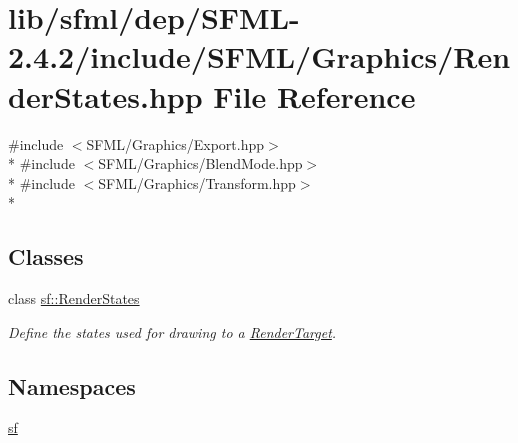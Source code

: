 \hypertarget{sfml_2dep_2_s_f_m_l-2_84_82_2include_2_s_f_m_l_2_graphics_2_render_states_8hpp}{\section{lib/sfml/dep/\-S\-F\-M\-L-\/2.4.2/include/\-S\-F\-M\-L/\-Graphics/\-Render\-States.hpp File Reference}
\label{sfml_2dep_2_s_f_m_l-2_84_82_2include_2_s_f_m_l_2_graphics_2_render_states_8hpp}
}
{\ttfamily \#include $<$S\-F\-M\-L/\-Graphics/\-Export.\-hpp$>$}\\*
{\ttfamily \#include $<$S\-F\-M\-L/\-Graphics/\-Blend\-Mode.\-hpp$>$}\\*
{\ttfamily \#include $<$S\-F\-M\-L/\-Graphics/\-Transform.\-hpp$>$}\\*
\subsection*{Classes}
\begin{DoxyCompactItemize}
\item 
class \hyperlink{classsf_1_1_render_states}{sf\-::\-Render\-States}
\begin{DoxyCompactList}\small\item\em Define the states used for drawing to a \hyperlink{classsf_1_1_render_target}{Render\-Target}. \end{DoxyCompactList}\end{DoxyCompactItemize}
\subsection*{Namespaces}
\begin{DoxyCompactItemize}
\item 
\hyperlink{namespacesf}{sf}
\end{DoxyCompactItemize}
